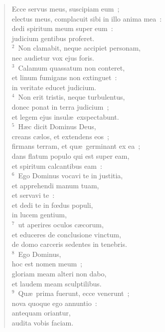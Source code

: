 \begin{flushleft}\begin{verse}\vspace{-19pt}\hspace{6pt}Ecce servus meus, suscipiam eum~;\\\hspace{6pt} electus meus, complacuit sibi in illo anima mea~:\\ dedi spiritum meum super eum~:\\ judicium gentibus proferet.\\
${}^{2}$~Non clamabit, neque accipiet personam,\\ nec audietur vox ejus foris.\\
${}^{3}$~Calamum quassatum non conteret,\\ et linum fumigans non extinguet~:\\ in veritate educet judicium.\\
${}^{4}$~Non erit tristis, neque turbulentus,\\ donec ponat in terra judicium~;\\ et legem ejus insul\ae\ exspectabunt.\\
${}^{5}$~H\ae c dicit Dominus Deus,\\ creans c\ae los, et extendens eos~;\\ firmans terram, et qu\ae\ germinant ex ea~;\\ dans flatum populo qui est super eam,\\ et spiritum calcantibus eam~:\\
${}^{6}$~Ego Dominus vocavi te in justitia,\\ et apprehendi manum tuam,\\ et servavi te~:\\ et dedi te in fœdus populi,\\ in lucem gentium,\\
${}^{7}$~ut aperires oculos c\ae corum,\\ et educeres de conclusione vinctum,\\ de domo carceris sedentes in tenebris.\\
${}^{8}$~Ego Dominus,\\ hoc est nomen meum~;\\ gloriam meam alteri non dabo,\\ et laudem meam sculptilibus.\\
${}^{9}$~Qu\ae\ prima fuerunt, ecce venerunt~;\\ nova quoque ego annuntio~:\\ antequam oriantur,\\ audita vobis faciam.\end{verse}\end{flushleft}


